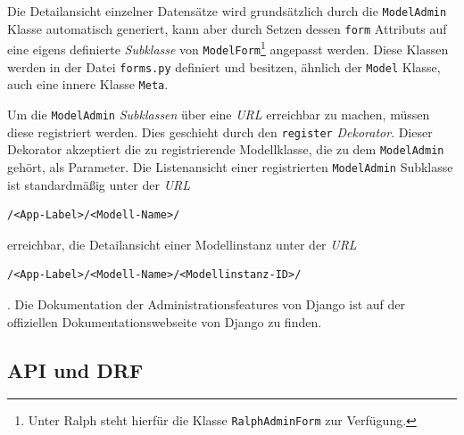 Die Detailansicht einzelner Datensätze wird grundsätzlich durch die
\texttt{ModelAdmin} Klasse automatisch generiert, kann aber durch Setzen
dessen \texttt{form} Attributs auf eine eigens definierte
\emph{Subklasse}
von \texttt{ModelForm}\footnote{Unter Ralph steht hierfür die Klasse
  \texttt{RalphAdminForm} zur Verfügung.} angepasst werden. Diese
Klassen werden in der Datei \texttt{forms.py} definiert und besitzen,
ähnlich der \texttt{Model} Klasse, auch eine innere Klasse
\texttt{Meta}.

Um die \texttt{ModelAdmin}
\emph{Subklassen}
über eine \emph{URL} 
erreichbar zu machen, müssen diese registriert werden. Dies geschieht
durch den \texttt{register}
\emph{Dekorator}.
Dieser Dekorator akzeptiert die zu registrierende Modellklasse, die zu
dem \texttt{ModelAdmin} gehört, als Parameter. Die Listenansicht einer
registrierten \texttt{ModelAdmin} Subklasse ist standardmäßig unter der
\emph{URL} 

\begin{verbatim}
/<App-Label>/<Modell-Name>/
\end{verbatim}

erreichbar, die Detailansicht einer Modellinstanz unter der \emph{URL}

\begin{verbatim}
/<App-Label>/<Modell-Name>/<Modellinstanz-ID>/
\end{verbatim}

. Die Dokumentation der Administrationsfeatures von Django ist auf der
offiziellen Dokumentationswebseite von Django \cite{django-doku-admin}
zu finden.

\hypertarget{api-und-drf}{%
\subsection{API und DRF}\label{api-und-drf}}

